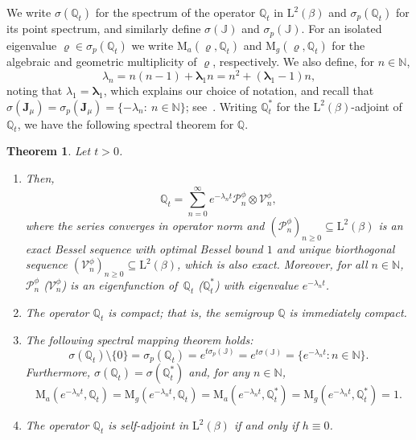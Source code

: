 \documentclass[JEP,XML,SOM,Unicode]{cedram}
\theoremstyle{plain}
\newtheorem{theorem}{Theorem}[section]
\theoremstyle{definition}
\newcommand{\N}{\mathbb{N}}
\renewcommand{\P}{\mathcal{P}}
\newcommand{\V}{\mathcal{V}}
\newcommand{\J}{\mathds{Q}}
\newcommand{\calJ}{\mathds{J}}
\newcommand{\Leb}{\mathrm{L}}
\newcommand{\calJd}{\mathbf{J}}
\newcommand{\lam}{{\bm{\lambda}_1}}
\let\mo\mu
\let\bpsi\beta
\begin{document}
We write $\sigma(\J_t)$ for the spectrum of the operator $\J_t$ in $\Leb^2(\bpsi)$ and $\sigma_p(\J_t)$ for its point spectrum, and similarly define $\sigma(\calJ)$ and $\sigma_p(\calJ)$. For an isolated eigenvalue $\varrho \in \sigma_p(\J_t)$ we write $\mathrm{M}_a(\varrho,\J_t)$ and $\mathrm{M}_g(\varrho,\J_t)$ for the algebraic and geometric multiplicity of $\varrho$, respectively. We also define, for $n \in \N$,
\begin{equation}
\label{eq:def-lambda-n}
\lambda_{n} = n(n-1)+\lam n = n^2+(\lam-1)n,
\end{equation}
noting that $\lambda_{1} = \lam$, which explains our choice of notation, and recall that $\sigma(\calJd_\mo) = \sigma_p(\calJd_\mo) = \{-\lambda_n: \ n \in \N\}$; see~. Writing $\J_t^*$ for the $\Leb^2(\bpsi)$-adjoint of $\J_t$, we have the following spectral theorem for $\J$.

\begin{theorem}
\label{thm:spectral-representation} Let $t > 0$.
\begin{enumerate}
\item \label{item-1:thm:spectral-representation} Then,
\begin{equation*}
\J_t = \sum_{n=0}^{\infty} e^{-\lambda_n t} \P_n^\phi \otimes \V_n^\phi,
\end{equation*}
where the series converges in operator norm and $(\P_n^\phi)_{n \geq 0} \subseteq \Leb^2(\bpsi)$ is an exact Bessel sequence with optimal Bessel bound $1$ and unique biorthogonal sequence $(\V_n^\phi)_{n \geq 0} \subseteq \Leb^2(\bpsi)$, which is also exact. Moreover, for all $n \in \N$, $\P_n^\phi$ ($\V_n^\phi$) is an eigenfunction of~$\J_t$ ($\J_t^*$) with eigenvalue $e^{-\lambda_n t}$.
\item \label{item-2:thm:spectral-representation} {The operator $\J_t$ is compact; that is, the semigroup $\J$ is immediately compact.}
\item \label{item-3:thm:spectral-representation} The following spectral mapping theorem holds:
\begin{equation*}
\sigma(\J_t) \setminus \{0\} = \sigma_p(\J_t) = e^{t\sigma_p(\calJ)} = e^{t\sigma(\calJ)} =\bigl\lbrace e^{-\lambda_n t} : n \in \N \bigr\rbrace.
\end{equation*}
Furthermore, $\sigma(\J_t) = \sigma(\J_t^*)$ and, for any $n \in \N$,
\begin{equation*}
\mathrm{M}_a(e^{-\lambda_n t},\J_t) = \mathrm{M}_g(e^{-\lambda_n t},\J_t) = \mathrm{M}_a(e^{-\lambda_n t},\J_t^*) = \mathrm{M}_g(e^{-\lambda_n t},\J_t^*) = 1.
\end{equation*}
\item \label{item-4:thm:spectral-representation} The operator $\J_t$ is self-adjoint in $\Leb^2(\bpsi)$ if and only if $h \equiv 0$.
\end{enumerate}
\end{theorem}
\end{document}
